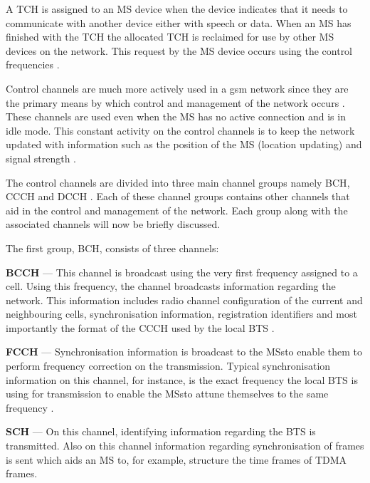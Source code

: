 A \gls{TCH} is assigned to an \gls{MS} device when the device indicates that it needs to communicate with another device either with speech or data. When an \gls{MS} has finished with the \gls{TCH} the allocated \gls{TCH} is reclaimed for use by other \gls{MS} devices on the network. This request by the \gls{MS} device occurs using the control frequencies \cite{GSMArchitectureProtocolsServices}.

Control channels are much more actively used in a \gls{gsm} network since they are the primary means by which control and management of the network occurs \cite{GSMArchitectureProtocolsServices}. These channels are used even when the \gls{MS} has no active connection and is in idle mode. This constant activity on the control channels is to keep the network updated with information such as the position of the \gls{MS} (location updating) and signal strength \cite{GSMArchitectureProtocolsServices,GSMSysEngin,Eisenblatter}. 

The control channels are divided into three main channel groups namely \gls{BCH}, \gls{CCCH} and \gls{DCCH} \cite{GSMArchitectureProtocolsServices}. Each of these channel groups contains other channels that aid in the control and management of the network. Each group along with the associated channels will now be briefly discussed.

The first group, \gls{BCH}, consists of three channels:
\begin{description}
  \item{\textbf{\Gls{BCCH}}} --- This channel is broadcast using the very first frequency assigned to a cell. Using this frequency, the channel broadcasts information regarding the network. This information includes radio channel configuration of the current and neighbouring cells, synchronisation information, registration identifiers and most importantly the format of the \gls{CCCH} used by the local \gls{BTS} \cite{GSMArchitectureProtocolsServices}.
  \item{\textbf{\Gls{FCCH}}} --- Synchronisation information is broadcast to the \glspl{MS}to enable them to perform frequency correction on the transmission. Typical synchronisation information on this channel, for instance, is the exact frequency the local \gls{BTS} is using for transmission to enable the \glspl{MS}to attune themselves to the same frequency \cite{GSMArchitectureProtocolsServices}.
  \item{\textbf{\Gls{SCH}}} --- On this channel, identifying information regarding the \gls{BTS} is transmitted. Also on this channel information regarding synchronisation of frames is sent which aids an \gls{MS} to, for example, structure the time frames of \gls{TDMA} frames.
\end{description}

